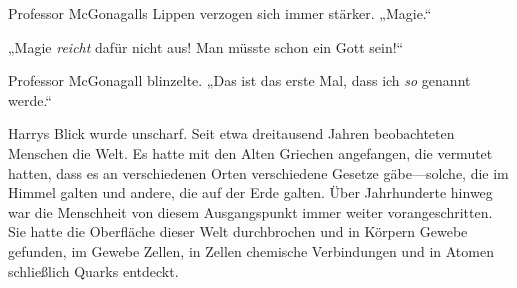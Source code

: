 Professor McGonagalls Lippen verzogen sich immer stärker. „Magie.“

„Magie \emph{reicht} dafür nicht aus! Man müsste schon ein Gott sein!“

Professor McGonagall blinzelte. „Das ist das erste Mal, dass ich \emph{so} genannt werde.“


Harrys Blick wurde unscharf. Seit etwa dreitausend Jahren beobachteten Menschen die Welt. Es hatte mit den Alten Griechen angefangen, die vermutet hatten, dass es an verschiedenen Orten verschiedene Gesetze gäbe—solche, die im Himmel galten und andere, die auf der Erde galten. Über Jahrhunderte hinweg war die Menschheit von diesem Ausgangspunkt immer weiter vorangeschritten. Sie hatte die Oberfläche dieser Welt durchbrochen und in Körpern Gewebe gefunden, im Gewebe Zellen, in Zellen chemische Verbindungen und in Atomen schließlich Quarks entdeckt.

